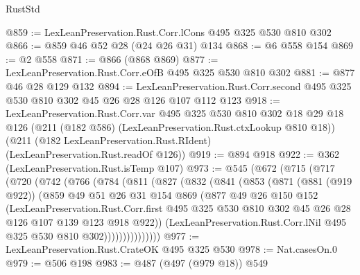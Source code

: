 \begin{lexlean}{RustStd}
\begin{coremodule}
@859 := LexLeanPreservation.Rust.Corr.lCons @495 @325 @530 @810 @302
@866 := @859 @46 @52 @28 (@24 @26 @31) @134
@868 := @6 @558 @154
@869 := @2 @558
@871 := @866 (@868 @869)
@877 := LexLeanPreservation.Rust.Corr.eOfB @495 @325 @530 @810 @302
@881 := @877 @46 @28 @129 @132
@894 := LexLeanPreservation.Rust.Corr.second
    @495
    @325
    @530
    @810
    @302
    @45
    @26
    @28
    @126
    @107
    @112
    @123
@918 := LexLeanPreservation.Rust.Corr.var
    @495
    @325
    @530
    @810
    @302
    @18
    @29
    @18
    @126
    (@211 (@182 @586) (LexLeanPreservation.Rust.ctxLookup @810 @18))
    (@211 (@182 LexLeanPreservation.Rust.RIdent) (LexLeanPreservation.Rust.readOf @126))
@919 := @894 @918
@922 := @362 (LexLeanPreservation.Rust.isTemp @107)
@973 := @545
    (@672
      (@715
        (@717
          (@720
            (@742
              (@766
                (@784
                  (@811
                    (@827
                      (@832
                        (@841
                          (@853
                            (@871
                              (@881 (@919 @922))
                              (@859
                                @49
                                @51
                                @26
                                @31
                                @154
                                @869
                                (@877
                                  @49
                                  @26
                                  @150
                                  @152
                                  (LexLeanPreservation.Rust.Corr.first
                                    @495
                                    @325
                                    @530
                                    @810
                                    @302
                                    @45
                                    @26
                                    @28
                                    @126
                                    @107
                                    @139
                                    @123
                                    @918
                                    @922))
                                (LexLeanPreservation.Rust.Corr.lNil
                                  @495
                                  @325
                                  @530
                                  @810
                                  @302)))))))))))))))
@977 := LexLeanPreservation.Rust.CrateOK @495 @325 @530
@978 := Nat.casesOn.{0}
@979 := @506 @198
@983 := @487 (@497 (@979 @18)) @549

\end{coremodule}
\end{lexlean}
